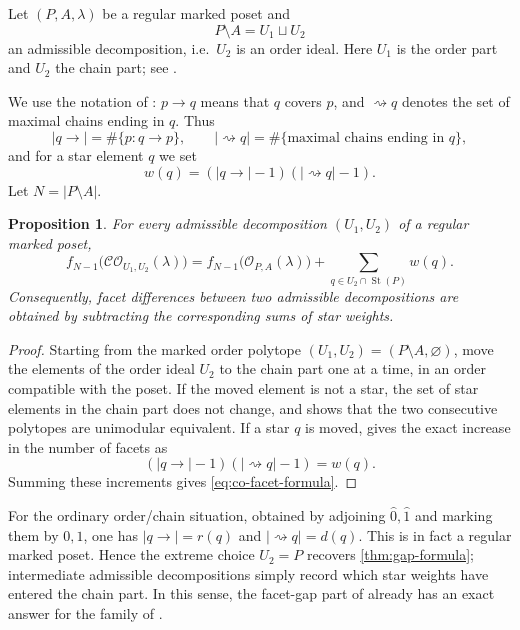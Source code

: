 \documentclass[a4paper, 11pt]{amsart}
\newtheorem{proposition}[theorem]{Proposition}
\theoremstyle{definition}
\theoremstyle{remark}
\newcommand{\cO}{\mathcal O}
\newcommand{\CO}{\mathcal{CO}}
\newcommand{\St}{\operatorname{St}}
\begin{document}
Let $(P,A,\lambda)$ be a regular marked poset and
\[
  P\setminus A=U_1\sqcup U_2
\]
an admissible decomposition, i.e.\ $U_2$ is an order ideal.
Here $U_1$ is the order part and $U_2$ the chain part; see
\cite[Definition~1.5]{FangFourier2016}.

We use the notation of \cite{FangFourier2016}: $p\to q$ means that
$q$ covers $p$, and $\rightsquigarrow q$ denotes the set of maximal
chains ending in $q$. Thus
\[
  |q\to|=\#\{p:q\to p\},
  \qquad
  |\rightsquigarrow q|
  =\#\{\text{maximal chains ending in }q\},
\]
and for a star element $q$ we set
\[
  w(q)=(|q\to|-1)(|\rightsquigarrow q|-1).
\]
Let $N=|P\setminus A|$.

\begin{proposition}\label{prop:q17-ff}
For every admissible decomposition $(U_1,U_2)$ of a regular marked poset,
\begin{equation}\label{eq:co-facet-formula}
 f_{N-1}\bigl(\CO_{U_1,U_2}(\lambda)\bigr)
 =f_{N-1}\bigl(\cO_{P,A}(\lambda)\bigr)
 +\sum_{q\in U_2\cap\St(P)}w(q).
\end{equation}
Consequently, facet differences between two admissible decompositions are obtained by subtracting the corresponding sums of star weights.
\end{proposition}

\begin{proof}
Starting from the marked order polytope $(U_1,U_2)=(P\setminus A,\varnothing)$, move the elements of the order ideal $U_2$ to the chain part one at a time, in an order compatible with the poset. If the moved element is not a star, the set of star elements in the chain part does not change, and \cite[Theorem~4.7]{FangFourier2016} shows that the two consecutive polytopes are unimodular equivalent. If a star $q$ is moved, \cite[Corollary~4.6]{FangFourier2016} gives the exact increase in the number of facets as
\[
  (|q\to|-1)(|\rightsquigarrow q|-1)=w(q).
\]
Summing these increments gives \eqref{eq:co-facet-formula}.
\end{proof}

For the ordinary order/chain situation, obtained by adjoining $\widehat 0,\widehat 1$ and marking them by $0,1$, one has $|q\to|=r(q)$ and $|\rightsquigarrow q|=d(q)$. This is in fact a regular marked poset. Hence the extreme choice $U_2=P$ recovers \cref{thm:gap-formula}; intermediate admissible decompositions simply record which star weights have entered the chain part. In this sense, the facet-gap part of \cite[Question~17]{BhandariEtAl2025} already has an exact answer for the family of \cite{FangFourier2016}.
\end{document}
